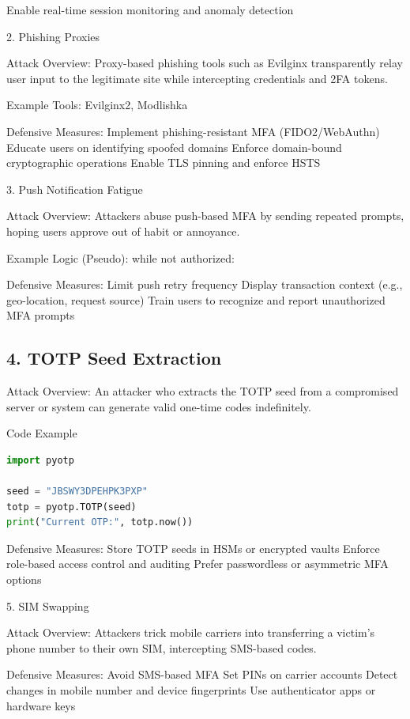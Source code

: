 Enable real-time session monitoring and anomaly detection


2. Phishing Proxies

Attack Overview:
Proxy-based phishing tools such as Evilginx transparently relay user input to the legitimate site while intercepting credentials and 2FA tokens.

Example Tools: Evilginx2, Modlishka

Defensive Measures:
Implement phishing-resistant MFA (FIDO2/WebAuthn)
Educate users on identifying spoofed domains
Enforce domain-bound cryptographic operations
Enable TLS pinning and enforce HSTS


3. Push Notification Fatigue

Attack Overview:
Attackers abuse push-based MFA by sending repeated prompts, hoping users approve out of habit or annoyance.

Example Logic (Pseudo):
while not authorized:


Defensive Measures:
Limit push retry frequency
Display transaction context (e.g., geo-location, request source)
Train users to recognize and report unauthorized MFA prompts

\subsection{4. TOTP Seed Extraction
}

Attack Overview:
An attacker who extracts the TOTP seed from a compromised server or system can generate valid one-time codes indefinitely.

Code Example \begin{lstlisting}[language=Python]
import pyotp

seed = "JBSWY3DPEHPK3PXP"
totp = pyotp.TOTP(seed)
print("Current OTP:", totp.now())
\end{lstlisting}


Defensive Measures:
Store TOTP seeds in HSMs or encrypted vaults
Enforce role-based access control and auditing
Prefer passwordless or asymmetric MFA options

5. SIM Swapping

Attack Overview:
Attackers trick mobile carriers into transferring a victim's phone number to their own SIM, intercepting SMS-based codes.

Defensive Measures:
Avoid SMS-based MFA
Set PINs on carrier accounts
Detect changes in mobile number and device fingerprints
Use authenticator apps or hardware keys


